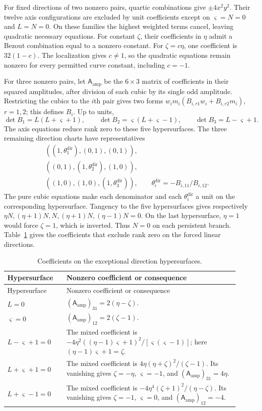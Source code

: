 \documentclass[11pt,a4paper]{article}
\numberwithin{equation}{section}
\theoremstyle{plain}
\theoremstyle{definition}
\theoremstyle{remark}
\begin{document}
For fixed directions of two nonzero pairs, quartic combinations give
$\pm4x^2y^2$. Their twelve axis configurations are excluded by unit
coefficients except on $\varsigma=N=0$ and $L=N=0$.
On these families the highest weighted terms cancel, leaving quadratic
necessary equations. For constant $\zeta$, their coefficients in $\eta$
admit a Bezout combination equal to a nonzero constant.
For $\zeta=c\eta$, one coefficient is $32(1-c)$.
The localization gives $c\ne1$, so the quadratic equations remain
nonzero for every permitted curve constant, including $c=-1$.

For three nonzero pairs, let $\mathsf A_{\mathrm{amp}}$ be the
$6\times3$ matrix of coefficients in their squared amplitudes,
after division of each cubic by its single odd amplitude. Restricting
the cubics to the $i$th pair gives two forms
$w_i m_i(B_{i,r1}w_i+B_{i,r2}m_i)$, $r=1,2$; this defines $B_i$.
Up to units,
\[
 \det B_1=L(L+\varsigma+1),\qquad
 \det B_2=\varsigma(L+\varsigma-1),\qquad
 \det B_3=L-\varsigma+1.
\]
The axis equations reduce rank zero to these five hypersurfaces.
The three remaining direction charts have representatives
\[
 \begin{gathered}
 ((1,\theta_1^{\mathrm{dir}}),(0,1),(0,1)),\\
 ((0,1),(1,\theta_2^{\mathrm{dir}}),(1,0)),\\
 ((1,0),(1,0),(1,\theta_3^{\mathrm{dir}})),\qquad
 \theta_i^{\mathrm{dir}}=-B_{i,11}/B_{i,12}.
 \end{gathered}
\]
The pure cubic equations make each denominator and each $\theta_i^{\mathrm{dir}}$
a unit on the corresponding hypersurface. Tangency to the five
hypersurfaces gives respectively
$\eta N,(\eta+1)N,N,(\eta+1)N,(\eta-1)N=0$.
On the last hypersurface, $\eta=1$ would force $\zeta=1$, which is
inverted. Thus $N=0$ on each persistent branch.
Table~\ref{tab:r3-direction-coefficients} gives the coefficients
that exclude rank zero on the forced linear directions.
\begin{longtable}{@{}p{0.24\linewidth}p{0.7\linewidth}@{}}
\caption{Coefficients on the exceptional direction hypersurfaces.}\label{tab:r3-direction-coefficients}\\
\toprule Hypersurface & Nonzero coefficient or consequence\\\midrule\endfirsthead
\toprule Hypersurface & Nonzero coefficient or consequence\\\midrule\endhead
$L=0$ & $(\mathsf A_{\mathrm{amp}})_{31}=2(\eta-\zeta)$.\\
$\varsigma=0$ & $(\mathsf A_{\mathrm{amp}})_{12}=2(\zeta-1)$.\\
$L-\varsigma+1=0$ & The mixed coefficient is
$-4\eta^2((\eta-1)\varsigma+1)^2/[\varsigma(\varsigma-1)]$;
here $(\eta-1)\varsigma+1=\zeta$.\\
$L+\varsigma+1=0$ & The mixed coefficient is
$4\eta(\eta+\zeta)^2/(\zeta-1)$.
Its vanishing gives $\zeta=-\eta$, $\varsigma=-1$, and
$(\mathsf A_{\mathrm{amp}})_{31}=4\eta$.\\
$L+\varsigma-1=0$ & The mixed coefficient is
$-4\eta^4(\zeta+1)^2/(\eta-\zeta)$.
Its vanishing gives $\zeta=-1$, $\varsigma=0$, and
$(\mathsf A_{\mathrm{amp}})_{12}=-4$.\\
\bottomrule\end{longtable}
\end{document}
